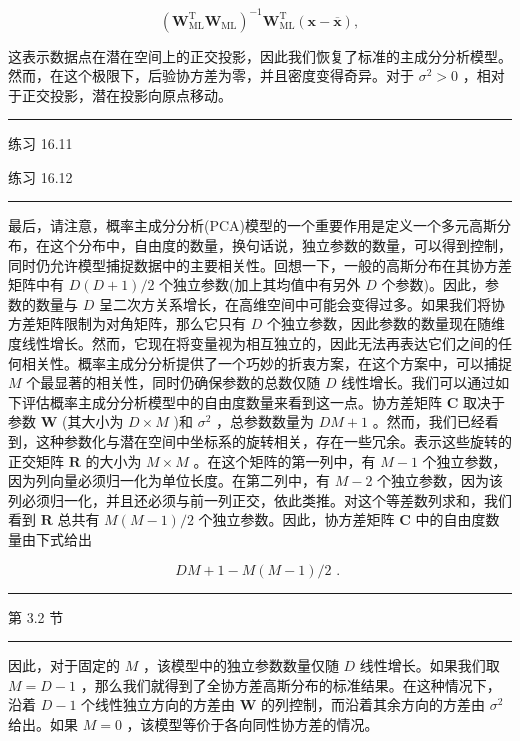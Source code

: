 \documentclass[10pt]{article}
\newcommand{\HRule}{\begin{center}\rule{0.9\linewidth}{0.2mm}\end{center}}
\begin{document}
\[
{\left( {\mathbf{W}}_{\mathrm{{ML}}}^{\mathrm{T}}{\mathbf{W}}_{\mathrm{{ML}}}\right) }^{-1}{\mathbf{W}}_{\mathrm{{ML}}}^{\mathrm{T}}\left( {\mathbf{x} - \overline{\mathbf{x}}}\right) , \tag{16.51}
\]

这表示数据点在潜在空间上的正交投影，因此我们恢复了标准的主成分分析模型。然而，在这个极限下，后验协方差为零，并且密度变得奇异。对于 \({\sigma }^{2} > 0\) ，相对于正交投影，潜在投影向原点移动。

\HRule

练习 16.11

练习 16.12

\HRule

最后，请注意，概率主成分分析(PCA)模型的一个重要作用是定义一个多元高斯分布，在这个分布中，自由度的数量，换句话说，独立参数的数量，可以得到控制，同时仍允许模型捕捉数据中的主要相关性。回想一下，一般的高斯分布在其协方差矩阵中有 \(D\left( {D + 1}\right) /2\) 个独立参数(加上其均值中有另外 \(D\) 个参数)。因此，参数的数量与 \(D\) 呈二次方关系增长，在高维空间中可能会变得过多。如果我们将协方差矩阵限制为对角矩阵，那么它只有 \(D\) 个独立参数，因此参数的数量现在随维度线性增长。然而，它现在将变量视为相互独立的，因此无法再表达它们之间的任何相关性。概率主成分分析提供了一个巧妙的折衷方案，在这个方案中，可以捕捉 \(M\) 个最显著的相关性，同时仍确保参数的总数仅随 \(D\) 线性增长。我们可以通过如下评估概率主成分分析模型中的自由度数量来看到这一点。协方差矩阵 \(\mathbf{C}\) 取决于参数 \(\mathbf{W}\) (其大小为 \(D \times  M\) )和 \({\sigma }^{2}\) ，总参数数量为 \({DM} + 1\) 。然而，我们已经看到，这种参数化与潜在空间中坐标系的旋转相关，存在一些冗余。表示这些旋转的正交矩阵 \(\mathbf{R}\) 的大小为 \(M \times  M\) 。在这个矩阵的第一列中，有 \(M - 1\) 个独立参数，因为列向量必须归一化为单位长度。在第二列中，有 \(M - 2\) 个独立参数，因为该列必须归一化，并且还必须与前一列正交，依此类推。对这个等差数列求和，我们看到 \(\mathbf{R}\) 总共有 \(M\left( {M - 1}\right) /2\) 个独立参数。因此，协方差矩阵 \(\mathbf{C}\) 中的自由度数量由下式给出

\[
{DM} + 1 - M\left( {M - 1}\right) /2\text{ . } \tag{16.52}
\]

\HRule

第 3.2 节

\HRule

因此，对于固定的 \(M\) ，该模型中的独立参数数量仅随 \(D\) 线性增长。如果我们取 \(M = D - 1\) ，那么我们就得到了全协方差高斯分布的标准结果。在这种情况下，沿着 \(D - 1\) 个线性独立方向的方差由 \(\mathbf{W}\) 的列控制，而沿着其余方向的方差由 \({\sigma }^{2}\) 给出。如果 \(M = 0\) ，该模型等价于各向同性协方差的情况。
\end{document}
